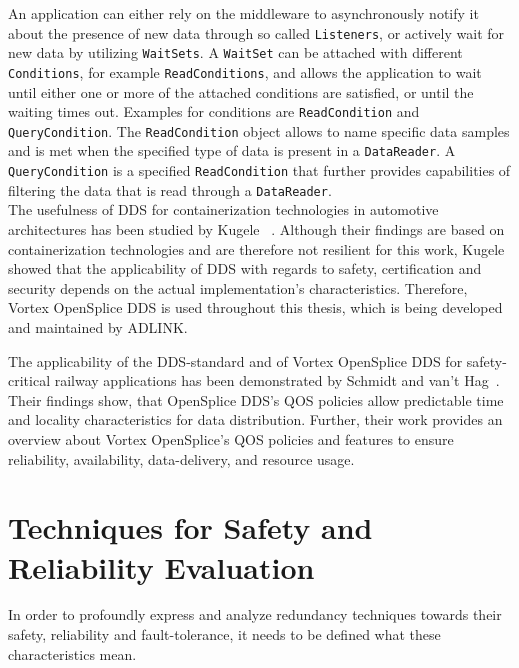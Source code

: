 An application can either rely on the middleware to asynchronously notify it about the presence of new data through so called \texttt{Listeners}, or actively wait for new data by utilizing \texttt{WaitSets}.
A \texttt{WaitSet} can be attached with different \texttt{Conditions}, for example \texttt{ReadConditions}, and allows the application to wait until either one or more of the attached conditions are satisfied, or until the waiting times out.
Examples for conditions are \texttt{ReadCondition} and \texttt{QueryCondition}.
The \texttt{ReadCondition} object allows to name specific data samples and is met when the specified type of data is present in a \texttt{DataReader}.
A \texttt{QueryCondition} is a specified \texttt{ReadCondition} that further provides capabilities of filtering the data that is read through a \texttt{DataReader}.
\\

The usefulness of \gls*{DDS} for containerization technologies in automotive architectures has been studied by Kugele \etal~\cite{KugeleDataCentricForAuto}.
Although their findings are based on containerization technologies and are therefore not resilient for this work, Kugele \etal showed that the applicability of \gls*{DDS} with regards to safety, certification and security depends on the actual implementation's characteristics.
Therefore, Vortex OpenSplice DDS is used throughout this thesis, which is being developed and maintained by ADLINK.

The applicability of the \gls*{DDS}-standard and of Vortex OpenSplice \gls*{DDS} for safety-critical railway applications has been demonstrated by Schmidt and van't Hag~\cite{SchmidtMissionCriticalChallenges}.
Their findings show, that OpenSplice \gls*{DDS}'s \gls*{QOS} policies allow predictable time and locality characteristics for data distribution.
Further, their work provides an overview about Vortex OpenSplice's \gls*{QOS} policies and features to ensure reliability, availability, data-delivery, and resource usage.

\section{Techniques for Safety and Reliability Evaluation}
\label{sec:techniquesSafetyReliability}
In order to profoundly express and analyze redundancy techniques towards their safety, reliability and fault-tolerance, it needs to be defined what these characteristics mean.
\\

